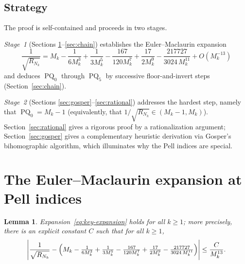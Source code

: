 \documentclass[12pt]{amsart}
\newtheorem{lemma}[theorem]{Lemma}
\theoremstyle{definition}
\DeclareMathOperator{\PQ}{PQ}
\begin{document}
\subsection{Strategy}

The proof is self-contained and proceeds in two stages.

\textit{Stage~1} (Sections \ref{sec:em}--\ref{sec:chain}) establishes
the Euler--Maclaurin expansion
\begin{equation}\label{eq:key-expansion}
  \frac{1}{\sqrt{R_{N_k}}}
  = M_k - \frac{1}{6M_k^3} + \frac{1}{3M_k^5} - \frac{167}{120M_k^7}
    + \frac{17}{2M_k^9} - \frac{217727}{3024\,M_k^{11}} + O(M_k^{-13})
\end{equation}
and deduces $\PQ_0$ through $\PQ_5$ by successive floor-and-invert steps
(Section~\ref{sec:chain}).

\textit{Stage~2} (Sections \ref{sec:gosper}--\ref{sec:rational})
addresses the hardest step, namely that
$\PQ_0 = M_k - 1$ (equivalently, that $1/\sqrt{R_{N_k}} \in (M_k-1, M_k)$).
Section~\ref{sec:rational} gives a rigorous proof by a rationalization
argument; Section~\ref{sec:gosper} gives a complementary heuristic
derivation via Gosper's bihomographic algorithm, which illuminates why
the Pell indices are special.

\section{The Euler--Maclaurin expansion at Pell indices}
\label{sec:em}

\begin{lemma}\label{lem:key}
  Expansion~\eqref{eq:key-expansion} holds for all $k \geq 1$; more
  precisely, there is an explicit constant $C$ such that for all
  $k \geq 1$,
  \[
    \left|\frac{1}{\sqrt{R_{N_k}}} -
      \Bigl(M_k - \tfrac{1}{6M_k^3} + \tfrac{1}{3M_k^5}
      - \tfrac{167}{120M_k^7} + \tfrac{17}{2M_k^9}
      - \tfrac{217727}{3024\,M_k^{11}}\Bigr)\right|
    \le \frac{C}{M_k^{13}}.
  \]
\end{lemma}
\end{document}
